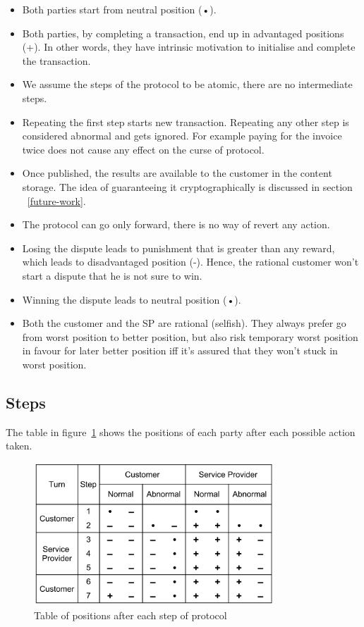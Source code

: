 \documentclass{ieeeaccess}
\begin{document}
\begin{itemize}

\item
  Both parties start from neutral position (•).
\item
  Both parties, by completing a transaction, end up in advantaged positions (+). In other words, they have intrinsic motivation to initialise and complete the transaction.
\item
  We assume the steps of the protocol to be atomic, there are no intermediate steps.
\item
  Repeating the first step starts new transaction. Repeating any other step is considered abnormal and gets ignored. For example paying for the invoice twice does not cause any effect on the curse of protocol.
\item
  Once published, the results are available to the customer in the content storage. The idea of guaranteeing it cryptographically is discussed in section ~\ref{future-work}.
\item
  The protocol can go only forward, there is no way of revert any action.
\item
  Losing the dispute leads to punishment that is greater than any reward, which leads to disadvantaged position (-). Hence, the rational customer won't start a dispute that he is not sure to win.
\item
  Winning the dispute leads to neutral position (•).
\item
  Both the customer and the SP are rational (selfish). They always prefer go from worst position to better position, but also risk temporary worst position in favour for later better position iff it's assured that they won't stuck in worst position.
\end{itemize}

\subsection{Steps}\label{steps}

The table in figure~\ref{fig:positions} shows the positions of each party after each possible action taken.

\begin{figure}[h!]
\includegraphics[width=9cm]{formal-table-of-positions.png}
\centering
\caption{Table of positions after each step of protocol}
\label{fig:positions}
\end{figure}
\end{document}
